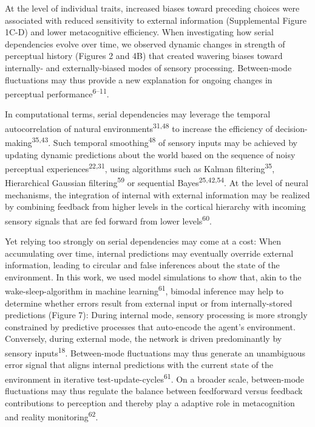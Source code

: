 \documentclass[
]{article}
\begin{document}
At the level of individual traits, increased biases toward preceding
choices were associated with reduced sensitivity to external information
(Supplemental Figure 1C-D) and lower metacognitive efficiency. When
investigating how serial dependencies evolve over time, we observed
dynamic changes in strength of perceptual history (Figures 2 and 4B)
that created wavering biases toward internally- and externally-biased
modes of sensory processing. Between-mode fluctuations may thus provide
a new explanation for ongoing changes in perceptual
performance\textsuperscript{6--11}.

In computational terms, serial dependencies may leverage the temporal
autocorrelation of natural environments\textsuperscript{31,48} to
increase the efficiency of decision-making\textsuperscript{35,43}. Such
temporal smoothing\textsuperscript{48} of sensory inputs may be achieved
by updating dynamic predictions about the world based on the sequence of
noisy perceptual experiences\textsuperscript{22,31}, using algorithms
such as Kalman filtering\textsuperscript{35}, Hierarchical Gaussian
filtering\textsuperscript{59} or sequential
Bayes\textsuperscript{25,42,54}. At the level of neural mechanisms, the
integration of internal with external information may be realized by
combining feedback from higher levels in the cortical hierarchy with
incoming sensory signals that are fed forward from lower
levels\textsuperscript{60}.

Yet relying too strongly on serial dependencies may come at a cost: When
accumulating over time, internal predictions may eventually override
external information, leading to circular and false inferences about the
state of the environment. In this work, we used model simulations to
show that, akin to the wake-sleep-algorithm in machine
learning\textsuperscript{61}, bimodal inference may help to determine
whether errors result from external input or from internally-stored
predictions (Figure 7): During internal mode, sensory processing is more
strongly constrained by predictive processes that auto-encode the
agent's environment. Conversely, during external mode, the network is
driven predominantly by sensory inputs\textsuperscript{18}. Between-mode
fluctuations may thus generate an unambiguous error signal that aligns
internal predictions with the current state of the environment in
iterative test-update-cycles\textsuperscript{61}. On a broader scale,
between-mode fluctuations may thus regulate the balance between
feedforward versus feedback contributions to perception and thereby play
a adaptive role in metacognition and reality
monitoring\textsuperscript{62}.
\end{document}
